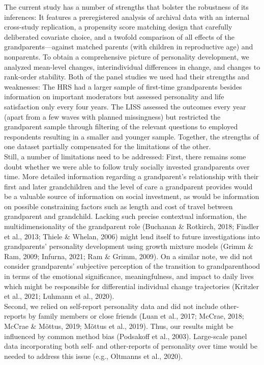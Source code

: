 \documentclass[
  english,
  man, noextraspace]{apa7}
\begin{document}
The current study has a number of strengths that bolster the robustness of its inferences: It features a preregistered analysis of archival data with an internal cross-study replication, a propensity score matching design that carefully deliberated covariate choice, and a twofold comparison of all effects of the grandparents---against matched parents (with children in reproductive age) and nonparents. To obtain a comprehensive picture of personality development, we analyzed mean-level changes, interindividual differences in change, and changes to rank-order stability. Both of the panel studies we used had their strengths and weaknesses: The HRS had a larger sample of first-time grandparents besides information on important moderators but assessed personality and life satisfaction only every four years. The LISS assessed the outcomes every year (apart from a few waves with planned missingness) but restricted the grandparent sample through filtering of the relevant questions to employed respondents resulting in a smaller and younger sample. Together, the strengths of one dataset partially compensated for the limitations of the other.\\
Still, a number of limitations need to be addressed: First, there remains some doubt whether we were able to follow truly socially invested grandparents over time. More detailed information regarding a grandparent's relationship with their first and later grandchildren and the level of care a grandparent provides would be a valuable source of information on social investment, as would be information on possible constraining factors such as length and cost of travel between grandparent and grandchild. Lacking such precise contextual information, the multidimensionality of the grandparent role (Buchanan \& Rotkirch, 2018; Findler et al., 2013; Thiele \& Whelan, 2006) might lend itself to future investigations into grandparents' personality development using growth mixture models (Grimm \& Ram, 2009; Infurna, 2021; Ram \& Grimm, 2009). On a similar note, we did not consider grandparents' subjective perception of the transition to grandparenthood in terms of the emotional significance, meaningfulness, and impact to daily lives which might be responsible for differential individual change trajectories (Kritzler et al., 2021; Luhmann et al., 2020).\\
Second, we relied on self-report personality data and did not include other-reports by family members or close friends (Luan et al., 2017; McCrae, 2018; McCrae \& Mõttus, 2019; Mõttus et al., 2019). Thus, our results might be influenced by common method bias (Podsakoff et al., 2003). Large-scale panel data incorporating both self- and other-reports of personality over time would be needed to address this issue (e.g., Oltmanns et al., 2020).\\
\end{document}
